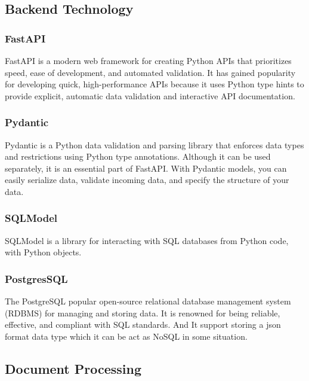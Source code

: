 \documentclass[12pt,oneside,openright,a4paper]{cpe-english-project}
\begin{document}
\subsection{Backend Technology}
\subsubsection{FastAPI} FastAPI is a modern web framework for creating Python APIs that prioritizes speed, ease of development, and automated validation. It has gained popularity for developing quick, high-performance APIs because it uses Python type hints to provide explicit, automatic data validation and interactive API documentation.

\subsubsection{Pydantic} Pydantic is a Python data validation and parsing library that enforces data types and restrictions using Python type annotations. Although it can be used separately, it is an essential part of FastAPI. With Pydantic models, you can easily serialize data, validate incoming data, and specify the structure of your data.

\subsubsection{SQLModel} SQLModel is a library for interacting with SQL databases from Python code, with Python objects.

\subsubsection{PostgresSQL} The PostgreSQL popular open-source relational database management system (RDBMS) for managing and storing data. It is renowned for being reliable, effective, and compliant with SQL standards. And It support storing a json format data type which it can be act as NoSQL in some situation.

\subsection{Document Processing}
\end{document}
